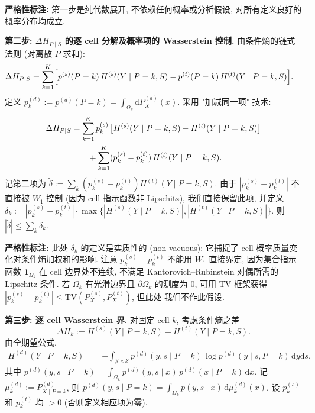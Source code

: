 \documentclass[12pt,a4paper]{article}
\newcommand{\cY}{\mathcal{Y}}
\newcommand{\cS}{\mathcal{S}}
\newcommand{\TV}{\mathrm{TV}}
\newcommand{\annotation}{\medskip\noindent\textbf{严格性标注: }}
\begin{document}
\medskip\noindent
\annotation 第一步是纯代数展开, 不依赖任何概率或分析假设,
对所有定义良好的概率分布均成立.

\medskip\noindent
\textbf{第二步: $\Delta H_{P\mid S}$ 的逐 cell 分解及概率项的 Wasserstein 控制.}
由条件熵的链式法则 (对离散 $P$ 求和):
\begin{align}
    \Delta H_{P\mid S}
    &= \sum_{k=1}^{K} \Bigl[
        p^{(s)}(P=k)\,H^{(s)}(Y\mid P=k,S)
        - p^{(t)}(P=k)\,H^{(t)}(Y\mid P=k,S)
    \Bigr]. \label{eq:step2a}
\end{align}
定义 $p^{(d)}_k := p^{(d)}(P=k)=\int_{\Omega_k}\mathrm{d}P^{(d)}_X(x)$.
采用 "加减同一项" 技术:
\begin{align}
    \Delta H_{P\mid S}
    &= \sum_{k=1}^{K} p^{(s)}_k\,
       \bigl[H^{(s)}(Y\mid P=k,S)-H^{(t)}(Y\mid P=k,S)\bigr] \notag\\
    &\qquad + \sum_{k=1}^{K} (p^{(s)}_k-p^{(t)}_k)\,
       H^{(t)}(Y\mid P=k,S). \label{eq:step2b}
\end{align}
记第二项为 $\widetilde{\delta} := \sum_k (p^{(s)}_k-p^{(t)}_k)
H^{(t)}(Y\mid P=k,S)$. 由于 $|p^{(s)}_k-p^{(t)}_k|$ 不直接被
$W_1$ 控制 (因为 cell 指示函数非 Lipschitz), 我们直接保留此项,
并定义 $\delta_k := |p^{(s)}_k-p^{(t)}_k|\cdot
\max\{|H^{(s)}(Y\mid P=k,S)|,|H^{(t)}(Y\mid P=k,S)|\}$.
则 $|\widetilde{\delta}| \leq \sum_k \delta_k$.
\checkmark

\medskip\noindent
\annotation 此处 $\delta_k$ 的定义是实质性的 (non-vacuous):
它捕捉了 cell 概率质量变化对条件熵加权和的影响. 注意
$p^{(s)}_k-p^{(t)}_k$ 不能用 $W_1$ 直接界定, 因为集合指示函数
$\mathbf{1}_{\Omega_k}$ 在 cell 边界处不连续, 不满足
Kantorovich--Rubinstein 对偶所需的 Lipschitz 条件. 若 $\Omega_k$
有光滑边界且 $\partial\Omega_k$ 的测度为 0, 可用 TV 框架获得
$|p^{(s)}_k-p^{(t)}_k|\leq \TV(P^{(s)}_X,P^{(t)}_X)$, 但此处
我们不作此假设.

\medskip\noindent
\textbf{第三步: 逐 cell Wasserstein 界.}
对固定 cell $k$, 考虑条件熵之差
\begin{equation}\label{eq:step3a}
    \Delta H_k := H^{(s)}(Y\mid P=k,S) - H^{(t)}(Y\mid P=k,S).
\end{equation}
由全期望公式,
\begin{align*}
    H^{(d)}(Y\mid P=k,S)
    &= -\int_{\cY\times\cS} p^{(d)}(y,s\mid P=k)\,
       \log p^{(d)}(y\mid s,P=k)\,\mathrm{d}y\mathrm{d}s.
\end{align*}
其中 $p^{(d)}(y,s\mid P=k) = \int_{\Omega_k} p^{(d)}(y,s\mid x)\,
p^{(d)}(x\mid P=k)\,\mathrm{d}x$. 记
$\mu^{(d)}_k := P^{(d)}_{X\mid P=k}$, 则
$p^{(d)}(y,s\mid P=k) = \int_{\Omega_k} p(y,s\mid x)\,\mathrm{d}\mu^{(d)}_k(x)$.
设 $p^{(s)}_k$ 和 $p^{(t)}_k$ 均 $>0$ (否则定义相应项为零).
\end{document}
